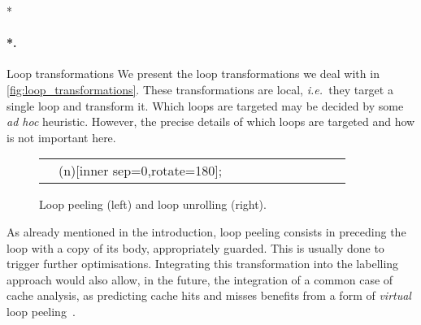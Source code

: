 \documentclass[submission,copyright,creativecommons]{eptcs}
\makeatletter
\theoremstyle{definition}
\newcommand{\ie}{\emph{i.e.\ }}
\let\oldparagraph\paragraph
\def\paragraph{\@ifnextchar*\new@paragraph@star\new@paragraph}
\def\new@paragraph@star*#1{\oldparagraph*{#1.}}
\def\new@paragraph#1{\oldparagraph{#1.}}
\makeatother
\begin{document}
\paragraph*{Loop transformations}
We present the loop transformations we deal with in \autoref{fig:loop_transformations}.
These transformations are local, \ie they target a single loop and transform it.
Which loops are targeted may be decided by some \emph{ad hoc} heuristic.
However, the precise details of which loops are targeted and how is not important here.
\begin{figure}
 \centering
\begin{tabular}{n*{5}{cn}}
&
\tikz[baseline={([yshift=-.5ex]n.mid)}]\node(n)[inner sep=0,rotate=180]{};
&
&

&
\end{tabular}
\caption{Loop peeling (left) and loop unrolling (right).}
\label{fig:loop_transformations}
\end{figure}

As already mentioned in the introduction, loop peeling consists in preceding the loop with a copy of its body, appropriately guarded.
This is usually done to trigger further optimisations.
Integrating this transformation into the labelling approach would also allow, in the future, the integration of a common case of cache analysis, as predicting cache hits and misses benefits from a form of \emph{virtual} loop peeling~\cite{cacheprediction}.
\end{document}
